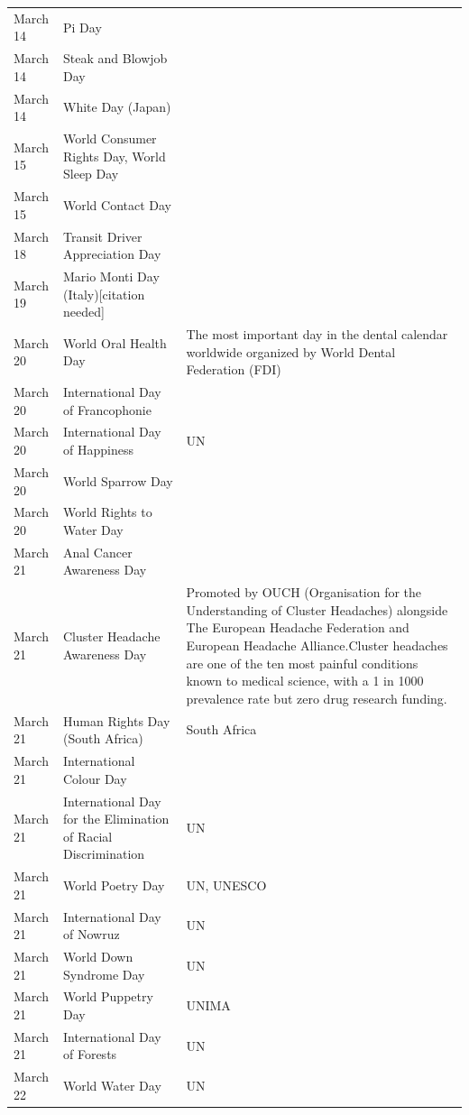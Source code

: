 \documentclass[
  openany]{book}
\begin{document}
\begin{longtable}[t]{>{\raggedright\arraybackslash}p{8em}>{\raggedright\arraybackslash}p{18em}>{\raggedright\arraybackslash}p{10em}}
March 14 & Pi Day & \\
\addlinespace
\rowcolor{gray!6}  March 14 & Steak and Blowjob Day & \\
March 14 & White Day (Japan) & \\
\rowcolor{gray!6}  March 15 & World Consumer Rights Day, World Sleep Day & \\
March 15 & World Contact Day & \\
\rowcolor{gray!6}  March 18 & Transit Driver Appreciation Day & \\
\addlinespace
March 19 & Mario Monti Day (Italy)[citation needed] & \\
\rowcolor{gray!6}  March 20 & World Oral Health Day & The most important day in the dental calendar worldwide organized by World Dental Federation (FDI)\\
March 20 & International Day of Francophonie & \\
\rowcolor{gray!6}  March 20 & International Day of Happiness & UN\\
March 20 & World Sparrow Day & \\
\addlinespace
\rowcolor{gray!6}  March 20 & World Rights to Water Day & \\
March 21 & Anal Cancer Awareness Day & \\
\rowcolor{gray!6}  March 21 & Cluster Headache Awareness Day & Promoted by OUCH (Organisation for the Understanding of Cluster Headaches) alongside The European Headache Federation and European Headache Alliance.Cluster headaches are one of the ten most painful conditions known to medical science, with a 1 in 1000 prevalence rate but zero drug research funding.\\
March 21 & Human Rights Day (South Africa) & South Africa\\
\rowcolor{gray!6}  March 21 & International Colour Day & \\
\addlinespace
March 21 & International Day for the Elimination of Racial Discrimination & UN\\
\rowcolor{gray!6}  March 21 & World Poetry Day & UN, UNESCO\\
March 21 & International Day of Nowruz & UN\\
\rowcolor{gray!6}  March 21 & World Down Syndrome Day & UN\\
March 21 & World Puppetry Day & UNIMA\\
\addlinespace
\rowcolor{gray!6}  March 21 & International Day of Forests & UN\\
March 22 & World Water Day & UN\\

\end{longtable}
\end{document}
